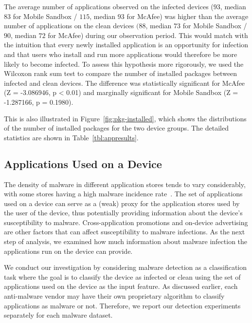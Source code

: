 The average number of applications observed on the infected devices
($93$, median $83$ for Mobile Sandbox / $115$, median $93$ for McAfee) was higher than the average number of applications on the clean devices
$(88$, median $73$ for Mobile Sandbox / $90$, median $72$ for McAfee) during our observation period. This would match with the
intuition that every newly installed application is an opportunity for
infection and that users who install and run more applications would therefore
be more likely to become infected. To assess this hypothesis more
rigorously, we used the Wilcoxon rank sum test to compare the number of installed
packages between infected and clean devices. The
difference was statistically significant for McAfee (Z = -3.086946, p < 0.01) and marginally significant for Mobile Sandbox (Z = -1.287166, p = 0.1980).
 
This is also illustrated in Figure~\ref{fig:pkg-installed}, which
shows the distributions of the number of installed packages for the
two device groups.  The detailed statistics are shown in
Table~\ref{tbl:appresults}.
\fi



\subsection{Applications Used on a Device}
\label{subsec:predictions:applications}




The density of malware in different application stores tends to vary
considerably, with some stores having a high malware incidence
rate~\cite{yajin_zhou_hey_2012}. The set of applications used on a
device can serve as a (weak) proxy for the application stores used by
the user of the device, thus potentially providing information about
the device's susceptibility to malware. Cross-application promotions
and on-device advertising are other factors that can affect
susceptibility to malware infections. As the next step of analysis, we
examined how much information about malware infection the applications
run on the device can provide.

We conduct our investigation by considering malware detection as a
classification task where the goal is to classify the device as
infected or clean using the set of applications used on the
device as the input feature. As discussed earlier, each anti-malware
vendor may have their own proprietary algorithm to classify
applications as malware or not.  Therefore, we report our detection
experiments separately for each malware dataset.

